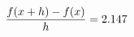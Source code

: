 \documentclass[preview]{standalone}
\begin{document}
\begin{align*}
\special{dvisvgm:raw <g id='unique000'>}\frac{f(x+h)-f(x)}{h} = 2.147\special{dvisvgm:raw </g>}
\end{align*}
\end{document}
